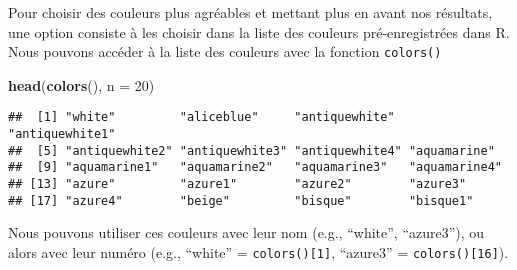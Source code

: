 \documentclass[]{book}
\newenvironment{Shaded}{\begin{snugshade}}{\end{snugshade}}
\newcommand{\KeywordTok}[1]{\textcolor[rgb]{0.13,0.29,0.53}{\textbf{#1}}}
\newcommand{\DataTypeTok}[1]{\textcolor[rgb]{0.13,0.29,0.53}{#1}}
\newcommand{\DecValTok}[1]{\textcolor[rgb]{0.00,0.00,0.81}{#1}}
\newcommand{\NormalTok}[1]{#1}
\theoremstyle{definition}
\theoremstyle{definition}
\theoremstyle{definition}
\theoremstyle{remark}
\begin{document}
Pour choisir des couleurs plus agréables et mettant plus en avant nos
résultats, une option consiste à les choisir dans la liste des couleurs
pré-enregistrées dans R. Nous pouvons accéder à la liste des couleurs
avec la fonction \texttt{colors()}

\begin{Shaded}
\begin{Highlighting}[]
\KeywordTok{head}\NormalTok{(}\KeywordTok{colors}\NormalTok{(), }\DataTypeTok{n =} \DecValTok{20}\NormalTok{)}
\end{Highlighting}
\end{Shaded}

\begin{verbatim}
##  [1] "white"         "aliceblue"     "antiquewhite"  "antiquewhite1"
##  [5] "antiquewhite2" "antiquewhite3" "antiquewhite4" "aquamarine"   
##  [9] "aquamarine1"   "aquamarine2"   "aquamarine3"   "aquamarine4"  
## [13] "azure"         "azure1"        "azure2"        "azure3"       
## [17] "azure4"        "beige"         "bisque"        "bisque1"
\end{verbatim}

Nous pouvons utiliser ces couleurs avec leur nom (e.g., ``white'',
``azure3''), ou alors avec leur numéro (e.g., ``white'' =
\texttt{colors(){[}1{]}}, ``azure3'' = \texttt{colors(){[}16{]}}).
\end{document}
